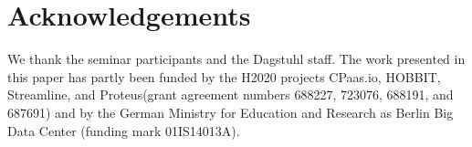 \section*{Acknowledgements}
We thank the seminar participants and the Dagstuhl staff.
The work presented in this paper has partly been funded by the H2020 projects CPaas.io, HOBBIT, Streamline, and Proteus(grant agreement numbers 688227, 723076, 688191, and 687691) and by the German Ministry for Education and Research as Berlin Big Data Center (funding mark 01IS14013A).
